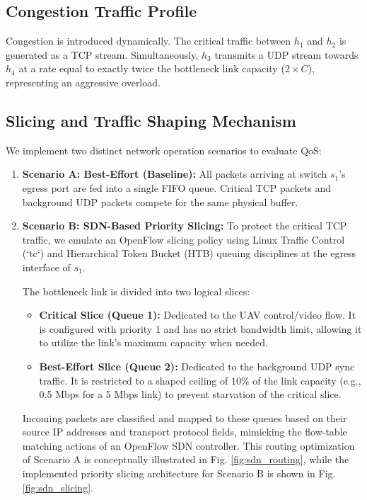 \documentclass[conference]{IEEEtran}
\begin{document}
\subsection{Congestion Traffic Profile}
Congestion is introduced dynamically. The critical traffic between $h_1$ and $h_2$ is generated as a TCP stream. Simultaneously, $h_3$ transmits a UDP stream towards $h_4$ at a rate equal to exactly twice the bottleneck link capacity ($2 \times C$), representing an aggressive overload.

\subsection{Slicing and Traffic Shaping Mechanism}
We implement two distinct network operation scenarios to evaluate QoS:
\begin{enumerate}
    \item \textbf{Scenario A: Best-Effort (Baseline):} All packets arriving at switch $s_1$'s egress port are fed into a single FIFO queue. Critical TCP packets and background UDP packets compete for the same physical buffer.
    \item \textbf{Scenario B: SDN-Based Priority Slicing:} To protect the critical TCP traffic, we emulate an OpenFlow slicing policy using Linux Traffic Control (`tc`) and Hierarchical Token Bucket (HTB) queuing disciplines at the egress interface of $s_1$. 
    
    The bottleneck link is divided into two logical slices:
    \begin{itemize}
        \item \textbf{Critical Slice (Queue 1):} Dedicated to the UAV control/video flow. It is configured with priority 1 and has no strict bandwidth limit, allowing it to utilize the link's maximum capacity when needed.
        \item \textbf{Best-Effort Slice (Queue 2):} Dedicated to the background UDP sync traffic. It is restricted to a shaped ceiling of $10\%$ of the link capacity (e.g., 0.5 Mbps for a 5 Mbps link) to prevent starvation of the critical slice.
    \end{itemize}
    Incoming packets are classified and mapped to these queues based on their source IP addresses and transport protocol fields, mimicking the flow-table matching actions of an OpenFlow SDN controller. This routing optimization of Scenario A is conceptually illustrated in Fig. \ref{fig:sdn_routing}, while the implemented priority slicing architecture for Scenario B is shown in Fig. \ref{fig:sdn_slicing}.
\end{enumerate}
\end{document}
